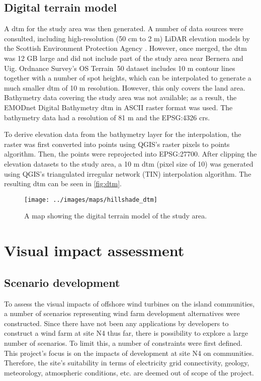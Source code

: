 \newpage
\subsection{Digital terrain model}

A \gls{dtm} for the study area was then generated. A number of data sources were consulted, including high-resolution (50 cm to 2 m) LiDAR elevation models by the Scottish Environment Protection Agency \autocite{sepa-lidar}. However, once merged, the \gls{dtm} was 12 GB large and did not include part of the study area near Bernera and Uig. Ordnance Survey's OS Terrain\textregistered\ 50 dataset includes 10 m contour lines together with a number of spot heights, which can be interpolated to generate a much smaller \gls{dtm} of 10 m resolution. However, this only covers the land area. Bathymetry data covering the study area was not available; as a result, the EMODnet Digital Bathymetry \gls{dtm} in ASCII raster format was used. The bathymetry data had a resolution of 81 m and the EPSG:4326 \gls{crs}.

To derive elevation data from the bathymetry layer for the interpolation, the raster was first converted into points using QGIS's raster pixels to points algorithm. Then, the points were reprojected into EPSG:27700. After clipping the elevation datasets to the study area, a 10 m \gls{dtm} (pixel size of 10) was generated using QGIS's triangulated irregular network (TIN) interpolation algorithm. The resulting \gls{dtm} can be seen in \autoref{fig:dtm}.

\begin{figure}
  \centering
  \texttt{[image: ../images/maps/hillshade\_dtm]}
  \caption{A map showing the digital terrain model of the study area. \label{fig:dtm}}
\end{figure}

\section{Visual impact assessment}

\subsection{Scenario development}

To assess the visual impacts of offshore wind turbines on the island communities, a number of scenarios representing wind farm development alternatives were constructed. Since there have not been any applications by developers to construct a wind farm at site N4 thus far, there is possibility to explore a large number of scenarios. To limit this, a number of constraints were first defined. This project's focus is on the impacts of development at site N4 on communities. Therefore, the site's suitability in terms of electricity grid connectivity, geology, meteorology, atmospheric conditions, etc. are deemed out of scope of the project.

